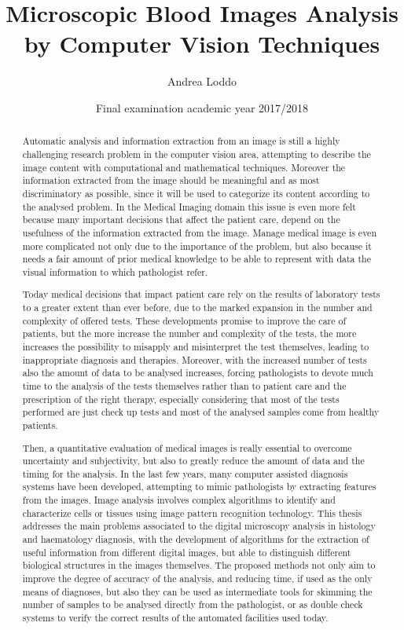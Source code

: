 \documentclass[final,a4paper,12pt,english]{UnicaPhdThesis3}
\title{Microscopic Blood Images Analysis by Computer Vision Techniques}
\author{Andrea Loddo}
\date{Final examination academic year 2017/2018}
\begin{document}
\maketitle

\begin{abstract} %
Automatic analysis and information extraction from an image is still a highly challenging research problem in the computer vision area, attempting to describe the image content with computational and mathematical techniques. Moreover the information extracted from the image should be meaningful and as most discriminatory as possible, since it will be used to categorize its content according to the analysed problem. In the Medical Imaging domain this issue is even more felt because many important decisions that affect the patient care, depend on the usefulness of the information extracted from the image. Manage medical image is even more complicated not only due to the importance of the problem, but also because it needs a fair amount of prior medical knowledge to be able to represent with data the visual information to which pathologist refer. 

Today medical decisions that impact patient care rely on the results of laboratory tests to a greater extent than ever before, due to the marked expansion in the number and complexity of offered tests. These developments promise to improve the care of patients, but the more increase the number and complexity of the tests, the more increases the possibility to misapply and misinterpret the test themselves, leading to inappropriate diagnosis and therapies.  Moreover, with the increased number of tests also the amount of data to be analysed increases, forcing pathologists to devote much time to the analysis of the tests themselves rather than to patient care and the prescription of the right therapy, especially considering that most of the tests performed are just check up tests and most of the analysed samples come from healthy patients.

Then, a quantitative evaluation of medical images is really essential to overcome uncertainty and subjectivity, but also to greatly reduce the amount of data and the timing for the analysis. In the last few years, many computer assisted diagnosis systems have been developed, attempting to mimic pathologists by extracting features from the images. Image analysis involves complex algorithms to identify and characterize cells or tissues using image pattern recognition technology. This thesis addresses the main problems associated to the digital microscopy analysis in histology and haematology diagnosis, with the development of algorithms for the extraction of useful information from different digital images, but able to distinguish different biological structures in the images themselves. The proposed methods not only aim to improve the degree of accuracy of the analysis, and reducing time, if used as the only means of diagnoses, but also they can be used as intermediate tools for skimming the number of samples to be analysed directly from the pathologist, or as double check systems to verify the correct results of the automated facilities used today.
\end{abstract}
\end{document}
